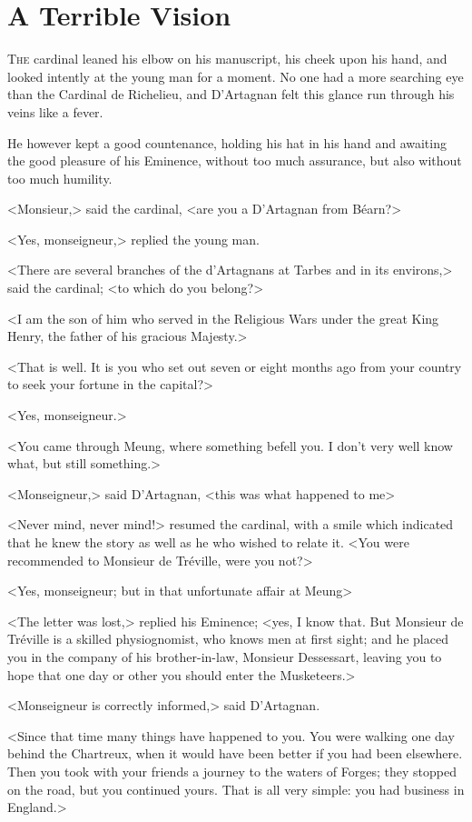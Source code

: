 
\chapter{A Terrible Vision}

\lettrine{T}{he} cardinal leaned his elbow on his manuscript, his cheek upon his hand, and looked intently at the young man for a moment. No one had a more searching eye than the Cardinal de Richelieu, and D'Artagnan felt this glance run through his veins like a fever. 

He however kept a good countenance, holding his hat in his hand and awaiting the good pleasure of his Eminence, without too much assurance, but also without too much humility. 

<Monsieur,> said the cardinal, <are you a D'Artagnan from Béarn?> 

<Yes, monseigneur,> replied the young man. 

<There are several branches of the d'Artagnans at Tarbes and in its environs,> said the cardinal; <to which do you belong?> 

<I am the son of him who served in the Religious Wars under the great King Henry, the father of his gracious Majesty.> 

<That is well. It is you who set out seven or eight months ago from your country to seek your fortune in the capital?> 

<Yes, monseigneur.> 

<You came through Meung, where something befell you. I don't very well know what, but still something.> 

<Monseigneur,> said D'Artagnan, <this was what happened to me\longdash> 

<Never mind, never mind!> resumed the cardinal, with a smile which indicated that he knew the story as well as he who wished to relate it. <You were recommended to Monsieur de Tréville, were you not?> 

<Yes, monseigneur; but in that unfortunate affair at Meung\longdash> 

<The letter was lost,> replied his Eminence; <yes, I know that. But Monsieur de Tréville is a skilled physiognomist, who knows men at first sight; and he placed you in the company of his brother-in-law, Monsieur Dessessart, leaving you to hope that one day or other you should enter the Musketeers.> 

<Monseigneur is correctly informed,> said D'Artagnan. 

<Since that time many things have happened to you. You were walking one day behind the Chartreux, when it would have been better if you had been elsewhere. Then you took with your friends a journey to the waters of Forges; they stopped on the road, but you continued yours. That is all very simple: you had business in England.> 

